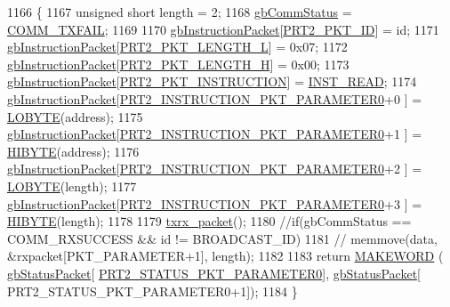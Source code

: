 \begin{DoxyCode}
1166 \{
1167     \textcolor{keywordtype}{unsigned} \textcolor{keywordtype}{short} length = 2;
1168     \hyperlink{classdynamixel2_a703e327ba8ec5909c238dc94a00cb32d}{gbCommStatus} = \hyperlink{dynamixel_8h_af88390c8be18c4079e65fd07b8d553be}{COMM\_TXFAIL}; 
1169 
1170     \hyperlink{classdynamixel2_a298efe9115fdbf77019af1001e801fb4}{gbInstructionPacket}[\hyperlink{dynamixel_8h_a3524b007f8f56ad0d80c1d0caf7e968a}{PRT2\_PKT\_ID}]                      = id;
1171     \hyperlink{classdynamixel2_a298efe9115fdbf77019af1001e801fb4}{gbInstructionPacket}[\hyperlink{dynamixel_8h_a9e77ab568957b64786c810967dec8b0c}{PRT2\_PKT\_LENGTH\_L}]                  = 0x07;
1172     \hyperlink{classdynamixel2_a298efe9115fdbf77019af1001e801fb4}{gbInstructionPacket}[\hyperlink{dynamixel_8h_a5ea18a21d722bf72217d5408c4d2a868}{PRT2\_PKT\_LENGTH\_H}]                  = 0x00;
1173     \hyperlink{classdynamixel2_a298efe9115fdbf77019af1001e801fb4}{gbInstructionPacket}[\hyperlink{dynamixel_8h_aece9dd9d7c0fa1714d53c568865d79ad}{PRT2\_PKT\_INSTRUCTION}]                = 
      \hyperlink{dynamixel_8h_a60599b6587736bb05efb8ea3c5e5f87f}{INST\_READ};
1174     \hyperlink{classdynamixel2_a298efe9115fdbf77019af1001e801fb4}{gbInstructionPacket}[\hyperlink{dynamixel_8h_a349ccb89ae957bdcc16856ec8e2dcb00}{PRT2\_INSTRUCTION\_PKT\_PARAMETER0}+0
      ]    = \hyperlink{dynamixel_8h_a04c0416272e5c07bdf955d803a21688e}{LOBYTE}(address);
1175     \hyperlink{classdynamixel2_a298efe9115fdbf77019af1001e801fb4}{gbInstructionPacket}[\hyperlink{dynamixel_8h_a349ccb89ae957bdcc16856ec8e2dcb00}{PRT2\_INSTRUCTION\_PKT\_PARAMETER0}+1
      ]    = \hyperlink{dynamixel_8h_a75c5b5f21e837e80c0feb4da9a421f87}{HIBYTE}(address);
1176     \hyperlink{classdynamixel2_a298efe9115fdbf77019af1001e801fb4}{gbInstructionPacket}[\hyperlink{dynamixel_8h_a349ccb89ae957bdcc16856ec8e2dcb00}{PRT2\_INSTRUCTION\_PKT\_PARAMETER0}+2
      ]    = \hyperlink{dynamixel_8h_a04c0416272e5c07bdf955d803a21688e}{LOBYTE}(length);
1177     \hyperlink{classdynamixel2_a298efe9115fdbf77019af1001e801fb4}{gbInstructionPacket}[\hyperlink{dynamixel_8h_a349ccb89ae957bdcc16856ec8e2dcb00}{PRT2\_INSTRUCTION\_PKT\_PARAMETER0}+3
      ]    = \hyperlink{dynamixel_8h_a75c5b5f21e837e80c0feb4da9a421f87}{HIBYTE}(length);
1178 
1179     \hyperlink{classdynamixel2_a2cccd455a52afe99a37b249aa834cdc7}{txrx\_packet}();
1180     \textcolor{comment}{//if(gbCommStatus == COMM\_RXSUCCESS && id != BROADCAST\_ID)}
1181     \textcolor{comment}{//  memmove(data, &rxpacket[PKT\_PARAMETER+1], length);}
1182 
1183     \textcolor{keywordflow}{return} \hyperlink{dynamixel_8h_a6b98c16b8e3e7733dd4063d0b0fac24c}{MAKEWORD} ( \hyperlink{classdynamixel2_a0776f210a190cf57d1a6faf9697a593d}{gbStatusPacket}[
      \hyperlink{dynamixel_8h_a7c79167a35ad785b57c7c8de66c59e5c}{PRT2\_STATUS\_PKT\_PARAMETER0}], \hyperlink{classdynamixel2_a0776f210a190cf57d1a6faf9697a593d}{gbStatusPacket}[
      PRT2\_STATUS\_PKT\_PARAMETER0+1]);
1184 \}
\end{DoxyCode}
\hypertarget{classdynamixel2_a674ea4cce4a1f807c0749ac7eb685cd6}{}
